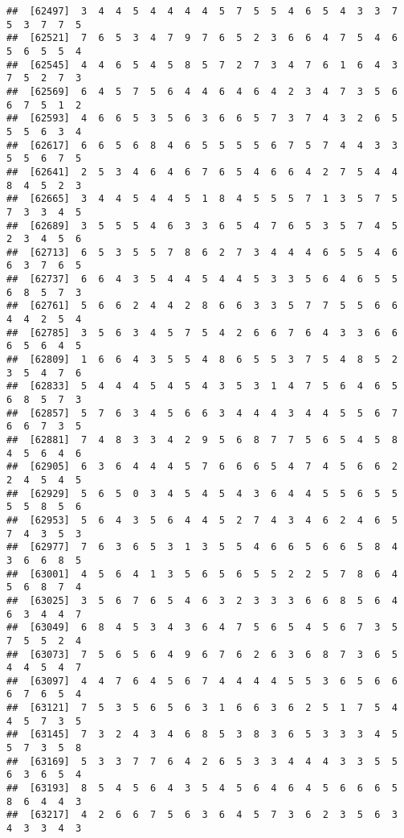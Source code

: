 \documentclass[
]{book}
\begin{document}
\begin{verbatim}
##  [62497]  3  4  4  5  4  4  4  4  5  7  5  5  4  6  5  4  3  3  7  5  3  7  7  5
##  [62521]  7  6  5  3  4  7  9  7  6  5  2  3  6  6  4  7  5  4  6  5  6  5  5  4
##  [62545]  4  4  6  5  4  5  8  5  7  2  7  3  4  7  6  1  6  4  3  7  5  2  7  3
##  [62569]  6  4  5  7  5  6  4  4  6  4  6  4  2  3  4  7  3  5  6  6  7  5  1  2
##  [62593]  4  6  6  5  3  5  6  3  6  6  5  7  3  7  4  3  2  6  5  5  5  6  3  4
##  [62617]  6  6  5  6  8  4  6  5  5  5  5  6  7  5  7  4  4  3  3  5  5  6  7  5
##  [62641]  2  5  3  4  6  4  6  7  6  5  4  6  6  4  2  7  5  4  4  8  4  5  2  3
##  [62665]  3  4  4  5  4  4  5  1  8  4  5  5  5  7  1  3  5  7  5  7  3  3  4  5
##  [62689]  3  5  5  5  4  6  3  3  6  5  4  7  6  5  3  5  7  4  5  2  3  4  5  6
##  [62713]  6  5  3  5  5  7  8  6  2  7  3  4  4  4  6  5  5  4  6  6  3  7  6  5
##  [62737]  6  6  4  3  5  4  4  5  4  4  5  3  3  5  6  4  6  5  5  6  8  5  7  3
##  [62761]  5  6  6  2  4  4  2  8  6  6  3  3  5  7  7  5  5  6  6  4  4  2  5  4
##  [62785]  3  5  6  3  4  5  7  5  4  2  6  6  7  6  4  3  3  6  6  6  5  6  4  5
##  [62809]  1  6  6  4  3  5  5  4  8  6  5  5  3  7  5  4  8  5  2  3  5  4  7  6
##  [62833]  5  4  4  4  5  4  5  4  3  5  3  1  4  7  5  6  4  6  5  6  8  5  7  3
##  [62857]  5  7  6  3  4  5  6  6  3  4  4  4  3  4  4  5  5  6  7  6  6  7  3  5
##  [62881]  7  4  8  3  3  4  2  9  5  6  8  7  7  5  6  5  4  5  8  4  5  6  4  6
##  [62905]  6  3  6  4  4  4  5  7  6  6  6  5  4  7  4  5  6  6  2  2  4  5  4  5
##  [62929]  5  6  5  0  3  4  5  4  5  4  3  6  4  4  5  5  6  5  5  5  5  8  5  6
##  [62953]  5  6  4  3  5  6  4  4  5  2  7  4  3  4  6  2  4  6  5  7  4  3  5  3
##  [62977]  7  6  3  6  5  3  1  3  5  5  4  6  6  5  6  6  5  8  4  3  6  6  8  5
##  [63001]  4  5  6  4  1  3  5  6  5  6  5  5  2  2  5  7  8  6  4  5  6  8  7  4
##  [63025]  3  5  6  7  6  5  4  6  3  2  3  3  3  6  6  8  5  6  4  6  3  4  4  7
##  [63049]  6  8  4  5  3  4  3  6  4  7  5  6  5  4  5  6  7  3  5  7  5  5  2  4
##  [63073]  7  5  6  5  6  4  9  6  7  6  2  6  3  6  8  7  3  6  5  4  4  5  4  7
##  [63097]  4  4  7  6  4  5  6  7  4  4  4  4  5  5  3  6  5  6  6  6  7  6  5  4
##  [63121]  7  5  3  5  6  5  6  3  1  6  6  3  6  2  5  1  7  5  4  4  5  7  3  5
##  [63145]  7  3  2  4  3  4  6  8  5  3  8  3  6  5  3  3  3  4  5  5  7  3  5  8
##  [63169]  5  3  3  7  7  6  4  2  6  5  3  3  4  4  4  3  3  5  5  6  3  6  5  4
##  [63193]  8  5  4  5  6  4  3  5  4  5  6  4  6  4  5  6  6  6  5  8  6  4  4  3
##  [63217]  4  2  6  6  7  5  6  3  6  4  5  7  3  6  2  3  5  6  3  4  3  3  4  3

\end{verbatim}
\end{document}
